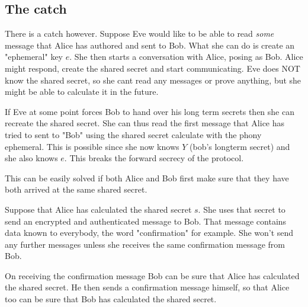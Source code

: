 \subsection{The catch}

There is a catch however. Suppose Eve would like to be able to read \emph{some} message that Alice has authored and sent to Bob.
What she can do is create an "ephemeral" key $e$.
She then starts a conversation with Alice, posing as Bob.
Alice might respond, create the shared secret and start communicating.
Eve does NOT know the shared secret, so she cant read any messages or prove anything, but she might be able to calculate it in the future.

If Eve at some point forces Bob to hand over his long term secrets then she can recreate the shared secret.
She can thus read the first message that Alice has tried to sent to "Bob" using the shared secret calculate with the phony ephemeral.
This is possible since she now knows $Y$ (bob's longterm secret) and she also knows $e$.
This breaks the forward secrecy of the protocol.

This can be easily solved if both Alice and Bob first make sure that they have both arrived at the same shared secret.

Suppose that Alice has calculated the shared secret $s$. She uses that secret to send an encrypted and authenticated message to Bob.
That message contains data known to everybody, the word "confirmation" for example.
She won't send any further messages unless she receives the same confirmation message from Bob.

On receiving the confirmation message Bob can be sure that Alice has calculated the shared secret.
He then sends a confirmation message himself, so that Alice too can be sure that Bob has calculated the shared secret.
